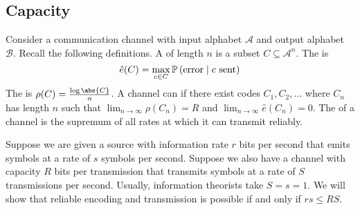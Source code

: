\subsection{Capacity}
Consider a communication channel with input alphabet $\mathcal A$ and output alphabet $\mathcal B$.
Recall the following definitions.
A  of length $n$ is a subset $C \subseteq \mathcal A^n$.
The  is
\[ \hat e(C) = \max_{c \in C} \mathbb{P}\left({\text{error} \mid c \text{ sent}}\right) \]
The  is $\rho(C) = \frac{\log \abs{C}}{n}$.
A channel can  if there exist codes $C_1, C_2, \dots$ where $C_n$ has length $n$ such that $\lim_{n \to \infty} \rho(C_n) = R$ and $\lim_{n \to \infty} \hat e(C_n) = 0$.
The  of a channel is the supremum of all rates at which it can transmit reliably.

Suppose we are given a source with information rate $r$ bits per second that emits symbols at a rate of $s$ symbols per second.
Suppose we also have a channel with capacity $R$ bits per transmission that transmits symbols at a rate of $S$ transmissions per second.
Usually, information theorists take $S = s = 1$.
We will show that reliable encoding and transmission is possible if and only if $rs \leq RS$.

